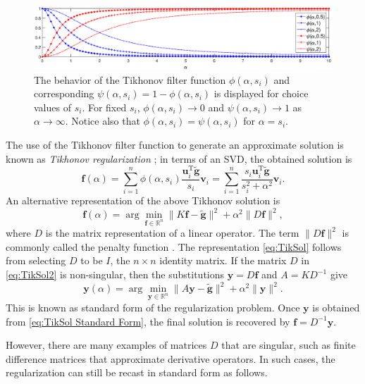 \documentclass[12pt]{article}
\newcommand{\gnoise}{\widetilde{\mathbf{g}}}
\newcommand{\kmat}{K}	%
\newcommand{\fdis}{\mathbf{f}}
\newcommand{\trans}{\mathrm{T}}	%
\newcommand{\regparam}{\alpha}
\newcommand{\filt}{\phi}
\newcommand{\mfilt}{\psi}
\newcommand{\singular}{s}	%
\newcommand{\LSV}{\mathbf{u}}	%
\newcommand{\RSV}{\mathbf{v}}	%
\begin{document}
\begin{figure}
	\centerline{\includegraphics[scale = 0.5]{Figures/Phi_Psi_Plot.eps}}
\caption{The behavior of the Tikhonov filter function $\filt(\regparam,\singular_i)$ and corresponding $\mfilt(\regparam,\singular_i) = 1 - \filt(\regparam,\singular_i)$ is displayed for choice values of $\singular_i$. For fixed $\singular_i$, $\filt(\regparam,\singular_i) \rightarrow 0$ and $\mfilt(\regparam,\singular_i) \rightarrow 1$ as $\regparam \rightarrow \infty$. Notice also that $\filt(\regparam,\singular_i) = \mfilt(\regparam,\singular_i)$ for $\alpha = \singular_i$.}
\label{fig:Phi Psi Plot}
\end{figure}

The use of the Tikhonov filter function to generate an approximate solution is known as \textit{Tikhonov regularization} \cite{Tikh1963}; in terms of an SVD, the obtained solution is
\begin{equation}
\fdis(\regparam) = \sum_{i = 1}^n \filt(\regparam,\singular_i)\frac{{\LSV^\trans_i}\gnoise}{\singular_i}\RSV_i = \sum_{i = 1}^n \frac{\singular_i{\LSV^\trans_i}\gnoise}{\singular_i^2 + \regparam^2}\RSV_i.
\label{eq:TikSol}
\end{equation}
An alternative representation of the above Tikhonov solution is
\begin{equation}
\fdis(\regparam) = \arg\min_{\fdis \in \mathbb{R}^n} \|\kmat\fdis - \gnoise\|^2 + \regparam^2\|D\fdis\|^2,
\label{eq:TikSol2}
\end{equation}
where $D$ is the matrix representation of a linear operator. The term $\|D\fdis\|^2$ is commonly called the penalty function \cite{Vogel:2002}. The representation \eqref{eq:TikSol} follows from selecting $D$ to be $I$, the $n \times n$ identity matrix. If the matrix $D$ in \eqref{eq:TikSol2} is non-singular, then the substitutions $\mathbf{y} = D\fdis$ and $A = \kmat{D}^{-1}$ give
\begin{equation}
\mathbf{y}(\regparam) = \arg\min_{\mathbf{y} \in \mathbb{R}^n} \|A\mathbf{y} - \gnoise\|^2 + \regparam^2\|\mathbf{y}\|^2.
\label{eq:TikSol Standard Form}
\end{equation}
This is known as standard form of the regularization problem. Once $\mathbf{y}$ is obtained from \eqref{eq:TikSol Standard Form}, the final solution is recovered by $\fdis = D^{-1}\mathbf{y}$.  \par 
However, there are many examples of matrices $D$ that are singular, such as finite difference matrices that approximate derivative operators. In such cases, the regularization can still be recast in standard form as follows. 
\end{document}
